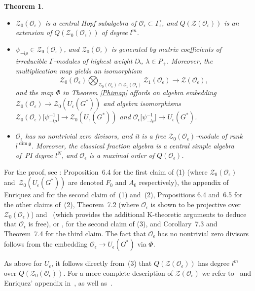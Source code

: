 \documentclass[pdftex]{sigma}
\numberwithin{equation}{section}
\newtheorem{teo}{Theorem}[section]
\theoremstyle{definition}
\newcommand{\e}{\epsilon}
\newcommand{\Oo}{{\mathcal O}}
\newcommand{\ra}{\rightarrow}
\begin{document}
\begin{teo} \label{DCLteo1} \quad
\begin{itemize}\itemsep=0pt
\item[$(1)$] $\mathcal{Z}_0(\Oo_\e)$ is a central Hopf subalgebra of $\Oo_\e\!\subset\! \Gamma_\e^\circ$, and $Q(\mathcal{Z}(\Oo_\e))$ is an extension of $Q(\mathcal{Z}_0(\Oo_\e))$ of degree $l^m$.
\item[$(2)$] $\psi_{-l\rho}\in \mathcal{Z}_0(\Oo_\e)$, and $\mathcal{Z}_0(\Oo_\e)$ is generated by matrix coefficients of irreducible $\Gamma$-modules of highest weight $l\lambda$, $\lambda\in P_+$. Moreover, the multiplication map yields an isomorphism
 \[
 \mathcal{Z}_0(\Oo_\e)\bigotimes_{\mathcal{Z}_0(\Oo_\e)\cap \mathcal{Z}_1(\Oo_\e)} \mathcal{Z}_1(\Oo_\e) \ra \mathcal{Z}(\Oo_\e),
 \]
 and the map $\Phi$ in Theorem {\rm\ref{Phimap}} affords an algebra embedding $\mathcal{Z}_0(\Oo_\e) \ra \mathcal{Z}_0(U_\e(G^*))$ and algebra isomorphisms $\mathcal{Z}_0(\Oo_\e)\big[\psi_{-l\rho}^{-1}\big] \ra \mathcal{Z}_0(U_\e(G^*))$ and $\Oo_\e\big[\psi_{-l\rho}^{-1}\big] \ra U_\e(G^*)$.
\item[$(3)$] $\Oo_\e$ has no nontrivial zero divisors, and it is a free $\mathcal{Z}_0(\Oo_\e)$-module of rank $l^{\dim \mathfrak{g}}$. Moreover, the classical fraction algebra \smash{$Q(\Oo_\e) = Q(\mathcal{Z}(\Oo_\e))\bigotimes_{\mathcal{Z}(\Oo_\e)} \Oo_\e$} is a central simple algebra of~PI degree $l^{N}$, and $\Oo_\e$ is a maximal order of $Q(\Oo_\e)$.
 \end{itemize}
\end{teo}
For the proof, see \cite{DC-L}: Proposition~6.4 for the first claim of (1) (where $\mathcal{Z}_0(\Oo_\e)$ and~$\mathcal{Z}_0(U_\e(G^*))$ are denoted $F_0$ and $A_0$ respectively), the appendix of Enriquez and \cite{Enr} for the second claim of~(1) and~(2), Propositions 6.4 and~6.5 for the other claims of~(2), Theorem~7.2 (where $\Oo_\e$ is shown to be projective over $\mathcal{Z}_0(\Oo_\e)$) and~\cite{BGS} (which provides the additional K-theoretic arguments to deduce that $\Oo_\e$ is free), or \cite[Remark~2.18\,(b)]{AnGa}, for the second claim of (3), and Corollary~7.3 and Theorem~7.4 for the third claim. The fact that $\Oo_\e$ has no nontrivial zero divisors follows from the embedding $\Oo_\e \ra U_\e(G^*)$ via $\Phi$.

As above for $U_\e$, it follows directly from~(3) that $Q(\mathcal{Z}(\Oo_\e))$ has degree $l^m$ over $Q(\mathcal{Z}_0(\Oo_\e))$. For a more complete description of $\mathcal{Z}(\Oo_\e)$ we refer to~\cite{Enr} and Enriquez' appendix in~\cite{DC-L}, as well as~\cite{BGOe}.
\end{document}
